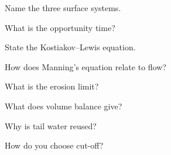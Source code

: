 \begin{exlist}
\item Name the three surface systems.
\item What is the opportunity time?
\item State the Kostiakov--Lewis equation.
\item How does Manning's equation relate to flow?
\item What is the erosion limit?
\item What does volume balance give?
\item Why is tail water reused?
\item How do you choose cut-off?
\end{exlist}
